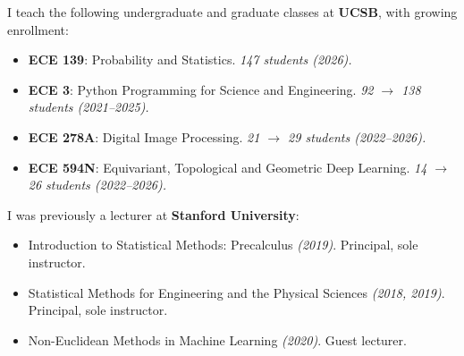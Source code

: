 
I teach the following undergraduate and graduate classes at \textbf{UCSB}, with growing enrollment:
\vspace{-2mm}
\begin{itemize}[leftmargin=*,itemsep=0.2em,topsep=0.2em,parsep=0pt,partopsep=0pt]
    \item \textbf{ECE 139}: Probability and Statistics. \textit{147 students (2026).}
    \item \textbf{ECE 3}: Python Programming for Science and Engineering. \textit{92 $\to$ 138 students (2021--2025).}
    \item \textbf{ECE 278A}: Digital Image Processing. \textit{21 $\to$ 29 students (2022--2026).}
    \item \textbf{ECE 594N}: Equivariant, Topological and Geometric Deep Learning. \textit{14 $\to$ 26 students (2022--2026).}
\end{itemize}

I was previously a lecturer at \textbf{Stanford University}:
\vspace{-2mm}
\begin{itemize}[leftmargin=*,itemsep=0.2em,topsep=0.2em,parsep=0pt,partopsep=0pt]
    \item Introduction to Statistical Methods: Precalculus \textit{(2019)}. Principal, sole instructor.
    \item Statistical Methods for Engineering and the Physical Sciences \textit{(2018, 2019)}. Principal, sole instructor.
    \item Non-Euclidean Methods in Machine Learning \textit{(2020)}. Guest lecturer.
\end{itemize}
